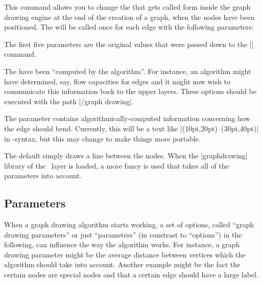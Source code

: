 \begin{command}{\pgfgdsetedgecallback{}}
  This command allows you to change the  that gets called
  form inside the graph drawing engine at the end of the creation of a
  graph, when the nodes have been positioned. The  will be 
  called once for each edge with the following parameters:
  \begin{quote}
  \end{quote}

  The first five parameters are the original values that were passed
  down to the |\pgfgdedge| command.
  
  The  have been ``computed by the
  algorithm''. For instance, an algorithm might have determined, say,
  flow capacities for edges and it might now wish to communicate this
  information back to the upper layers. These options should be
  executed with the path |/graph drawing|.
  
  The parameter  contains
  algorithmically-computed information concerning how the 
  edge should bend. Currently, this will be a text like
  |(10pt,20pt)--(30pt,40pt)| in \tikzname-syntax, but this may change
  to make things more portable.

  The default  simply draws a line between the nodes. When
  the |graphdrawing| library of the \tikzname\ layer is loaded, a more
  fancy  is used that takes all of the parameters into
  account.
\end{command}



\subsection{Parameters}
\label{section-gd-parameters}

When a graph drawing algorithm starts working, a set of options,
called ``graph drawing parameters'' or just ``parameters'' (in
constrast to ``options'') in the following, can influence
the way the algorithm works. For instance, a graph drawing parameter
might be the average distance between vertices which the algorithm
should take into account. Another example might be the fact the
certain nodes are special nodes and that a certain edge should have
a large label.

